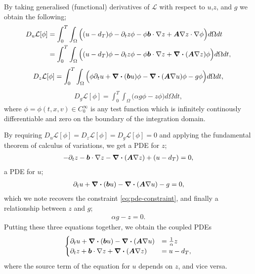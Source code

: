 By taking generalised (functional) derivatives of $\mathcal{L}$ with respect to $u$,$z$, and $g$ we obtain the following;
%
\begin{align} 
    D_u \mathcal{L}[\phi] &= \int_{0}^{T} \int_{\Omega} \Big((u-d_T)\phi - \partial_t z \phi - \phi \boldsymbol{b}\cdot\nabla z + \boldsymbol{A} \nabla z \cdot \nabla \phi \Big) d\Omega dt\\
    &= \int_{0}^{T} \int_{\Omega} \Big((u-d_T)\phi - \partial_t z \phi - \phi \boldsymbol{b}\cdot\nabla z + \div{(\boldsymbol{A} \nabla z)} \phi \Big) d\Omega dt,
\end{align}
%
\begin{align} 
    D_z\mathcal{L}[\phi] = \int_{0}^{T} \int_{\Omega} \Big( \phi \partial_t u + \div{(\boldsymbol{b}u)} \phi - \div{(\boldsymbol{A} \nabla u)} \phi - g \phi \Big) d\Omega dt,
\end{align}
%
\begin{align} 
    D_g\mathcal{L}[\phi] = \int_{0}^{T} \int_{\Omega} \Big( \alpha g \phi - z \phi \Big) d\Omega dt,
\end{align}
%
where $\phi = \phi(t,x,v) \in C^{\infty}_{0}$ is any test function which is infinitely continously differentiable and zero on the boundary of the integration domain.

By requiring $D_u \mathcal{L}[\phi]=D_z \mathcal{L}[\phi]=D_g \mathcal{L}[\phi]=0$ and applying the fundamental theorem of calculus of variations, we get a PDE for $z$;
%
\begin{align} 
    - \partial_t z - \boldsymbol{b} \cdot \nabla z - \div{(\boldsymbol{A} \nabla z)} + (u - d_T) = 0,
\end{align}
% 
a PDE for $u$;
%
\begin{align} 
    \partial_t u + \div{(\boldsymbol{b}u)} - \div{(\boldsymbol{A} \nabla u)} - g = 0,
\end{align}
%
which we note recovers the constraint \autoref{eq:pde-constraint}, and finally a relationship between $z$ and $g$;
%
\begin{align}
    \alpha g - z = 0. 
\end{align}
%
Putting these three equations together, we obtain the coupled PDEs 
%
\begin{align} 
    \label{eq:coupled-pdes}
    \begin{cases} 
        \partial_t u + \div{(\boldsymbol{b}u)} - \div{(\boldsymbol{A} \nabla u)} &= \frac{1}{\alpha} z\\
        \partial_t z + \boldsymbol{b} \cdot \nabla z + \div{(\boldsymbol{A} \nabla z)} &= u - d_T,
    \end{cases}
\end{align}
%
where the source term of the equation for $u$ depends on $z$, and vice versa.

